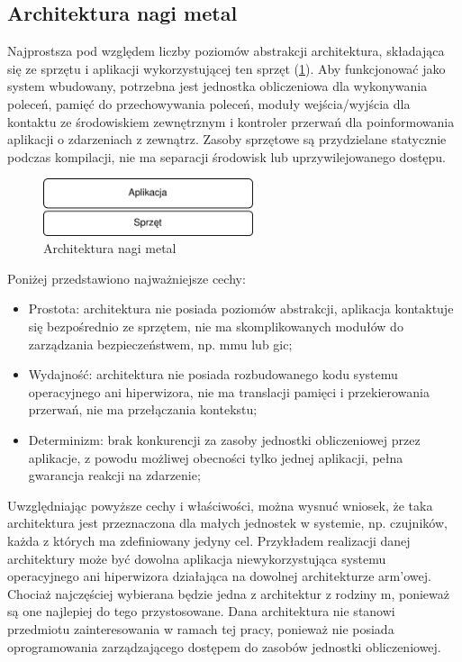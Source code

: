 \documentclass[../../main]{subfiles}
\begin{document}
\subsection{Architektura nagi metal}

Najprostsza pod względem liczby poziomów abstrakcji architektura, składająca się ze sprzętu i aplikacji wykorzystującej ten sprzęt (\cref{fig:bare-metal}). Aby funkcjonować jako system wbudowany, potrzebna jest jednostka obliczeniowa dla wykonywania poleceń, pamięć do przechowywania poleceń, moduły wejścia/wyjścia dla kontaktu ze środowiskiem zewnętrznym i kontroler przerwań dla poinformowania aplikacji o zdarzeniach z zewnątrz. Zasoby sprzętowe są przydzielane statycznie podczas kompilacji, nie ma separacji środowisk lub uprzywilejowanego dostępu.

\begin{figure}[ht]
    \centering
    \includegraphics[width=0.55\textwidth]{Images/bare-metal.png}
    \caption{Architektura nagi metal}
    \label{fig:bare-metal}
\end{figure}

Poniżej przedstawiono najważniejsze cechy:
\begin{itemize}
    \item Prostota: architektura nie posiada poziomów abstrakcji, aplikacja kontaktuje się bezpośrednio ze sprzętem, nie ma skomplikowanych modułów do zarządzania bezpieczeństwem, np.
    \gls{mmu} lub \gls{gic};
    \item Wydajność: architektura nie posiada rozbudowanego kodu systemu operacyjnego ani    hiperwizora, nie ma translacji pamięci i przekierowania przerwań, nie ma przełączania kontekstu;
    \item Determinizm: brak konkurencji za zasoby jednostki obliczeniowej przez aplikacje, z powodu możliwej obecności tylko jednej aplikacji, pełna gwarancja reakcji na zdarzenie;
\end{itemize}

Uwzględniając powyższe cechy i właściwości, można wysnuć wniosek, że taka architektura jest przeznaczona dla małych jednostek w systemie, np. czujników, każda z których ma zdefiniowany jedyny cel. Przykładem realizacji danej architektury może być dowolna aplikacja niewykorzystująca systemu operacyjnego ani hiperwizora działająca na dowolnej architekturze \gls{arm}'owej. Chociaż najczęściej wybierana będzie jedna z architektur z rodziny \gls{m}, ponieważ są one najlepiej do tego przystosowane. Dana architektura nie stanowi przedmiotu zainteresowania w ramach tej pracy, ponieważ nie posiada oprogramowania zarządzającego dostępem do zasobów jednostki obliczeniowej.
\end{document}
